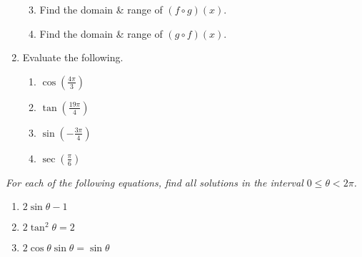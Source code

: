 \documentclass[11pt]{article}
\begin{document}
\begin{enumerate}
\begin{multicols}{2}
\begin{enumerate}
\setcounter{enumii}{2}
\item Find the domain \& range of $(f \circ g)(x)$.
\item Find the domain \& range of $(g \circ f)(x)$.
\end{enumerate}
\end{multicols}
\vfill

\item Evaluate the following.
\begin{multicols}{4}
\begin{enumerate}
\item $\cos\left( \frac{4\pi}{3} \right)$
\item $\tan\left( \frac{19\pi}{4} \right)$
\item $\sin\left( -\frac{3\pi}{4} \right)$
\item $\sec\left( \frac{\pi}{6} \right)$
\end{enumerate}
\end{multicols}
\setcounter{enumCount}{\theenumi}
\end{enumerate}
\vfill

\noindent
\textit{For each of the following equations, find all solutions in the interval $0 \le \theta < 2\pi$. }
\begin{multicols}{3}
\begin{enumerate}
\setcounter{enumi}{\theenumCount}
\item $2 \sin \theta - 1$
\item $2 \tan^2 \theta = 2$
\item $2 \cos \theta \sin \theta = \sin \theta$
\setcounter{enumCount}{\theenumi}
\end{enumerate}
\end{multicols}
\vfill
\end{document}
